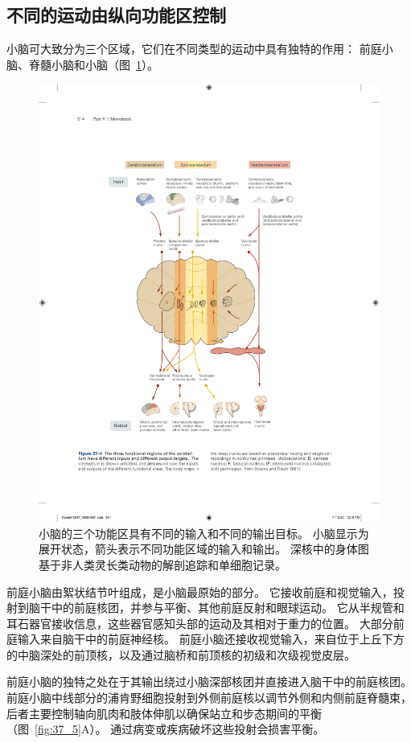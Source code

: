 \subsection{不同的运动由纵向功能区控制}

小脑可大致分为三个区域，它们在不同类型的运动中具有独特的作用：
前庭小脑、脊髓小脑和小脑（图~\ref{fig:37_4}）。


\begin{figure}[htbp]
	\centering
	\includegraphics[width=0.85\linewidth]{chap37/fig_37_4}
	\caption{小脑的三个功能区具有不同的输入和不同的输出目标。
		小脑显示为展开状态，箭头表示不同功能区域的输入和输出。
		深核中的身体图基于非人类灵长类动物的解剖追踪和单细胞记录\cite{brooks1981handbook}。}
	\label{fig:37_4}
\end{figure}


前庭小脑由絮状结节叶组成，是小脑最原始的部分。
它接收前庭和视觉输入，投射到脑干中的前庭核团，并参与平衡、其他前庭反射和眼球运动。
它从半规管和耳石器官接收信息，这些器官感知头部的运动及其相对于重力的位置。
大部分前庭输入来自脑干中的前庭神经核。
前庭小脑还接收视觉输入，来自位于上丘下方的中脑深处的前顶核，以及通过脑桥和前顶核的初级和次级视觉皮层。


前庭小脑的独特之处在于其输出绕过小脑深部核团并直接进入脑干中的前庭核团。
前庭小脑中线部分的浦肯野细胞投射到外侧前庭核以调节外侧和内侧前庭脊髓束，后者主要控制轴向肌肉和肢体伸肌以确保站立和步态期间的平衡（图~\ref{fig:37_5}A）。
通过病变或疾病破坏这些投射会损害平衡。


